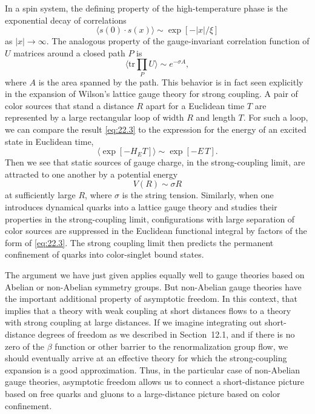 In a spin system, the defining property of the high-temperature phase is the
exponential decay of correlations
\begin{equation}
  \langle s(0)\cdot s(x)\rangle \sim \exp[-|x|/\xi]
  \label{eq:22.2}
\end{equation}
as $|x|\to\infty$.  The analogous property of the gauge-invariant correlation
function of $U$ matrices around a closed path $P$ is
\begin{equation}
  \bigl\langle \mathrm{tr}\prod_P U \bigr\rangle \sim e^{-\sigma A},
  \label{eq:22.3}
\end{equation}
where $A$ is the area spanned by the path.  This behavior is in fact seen
explicitly in the expansion of Wilson's lattice gauge theory for strong
coupling.  A pair of color sources that stand a distance $R$ apart for a
Euclidean time $T$ are represented by a large rectangular loop of width $R$
and length $T$.  For such a loop, we can compare the result \eqref{eq:22.3}
to the expression for the energy of an excited state in Euclidean time,
\begin{equation}
  \langle \exp[-H_E T] \rangle \sim \exp[-E\,T] .
  \label{eq:22.4}
\end{equation}
Then we see that static sources of gauge charge, in the strong-coupling
limit, are attracted to one another by a potential energy
\begin{equation}
  V(R) \sim \sigma R
  \label{eq:22.5}
\end{equation}
at sufficiently large $R$, where $\sigma$ is the string tension.  Similarly,
when one introduces dynamical quarks into a lattice gauge theory and studies
their properties in the strong-coupling limit, configurations with large
separation of color sources are suppressed in the Euclidean functional
integral by factors of the form of \eqref{eq:22.3}.  The strong coupling
limit then predicts the permanent confinement of quarks into color-singlet
bound states.

The argument we have just given applies equally well to gauge theories based
on Abelian or non-Abelian symmetry groups.  But non-Abelian gauge theories
have the important additional property of asymptotic freedom.  In this
context, that implies that a theory with weak coupling at short distances
flows to a theory with strong coupling at large distances.  If we imagine
integrating out short-distance degrees of freedom as we described in
Section~12.1, and if there is no zero of the $\beta$ function or other
barrier to the renormalization group flow, we should eventually arrive at an
effective theory for which the strong-coupling expansion is a good
approximation.  Thus, in the particular case of non-Abelian gauge theories,
asymptotic freedom allows us to connect a short-distance picture based on
free quarks and gluons to a large-distance picture based on color
confinement.

